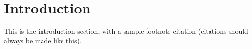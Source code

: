\documentclass[../main.tex]{subfiles}
\begin{document}
    
\chapter{Introduction}
    
This is the introduction section, with a sample footnote citation (citations should always be made like this).
\end{document}

